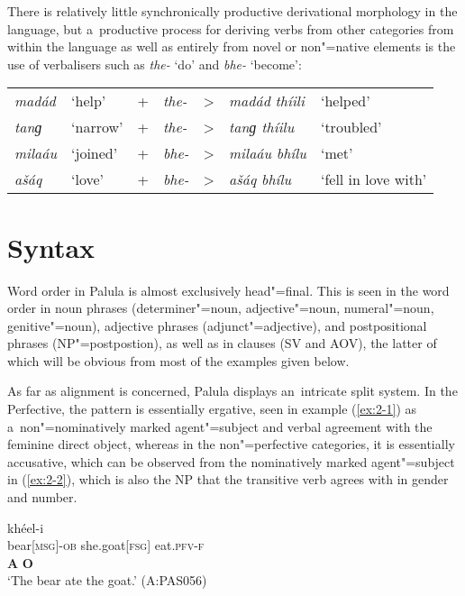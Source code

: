 There is relatively little synchronically productive derivational morphology in the language, but a~productive process for deriving verbs from other categories from within the language as well as entirely from novel or non"=native elements is the use of verbalisers such as \textit{the-} `do' and \textit{bhe-} `become':


\begin{table}[H]
\begin{tabularx}{\textwidth}{ l l l l l l l}
\textit{madád} &
`help' &
+ &
\textit{the-} &
{\textgreater} &
\textit{madád thíili} &
`helped'\\
\textit{tanɡ} &
`narrow' &
+ &
\textit{the-} &
{\textgreater} &
\textit{tanɡ thíilu} &
`troubled'\\
\textit{milaáu} &
`joined' &
+ &
\textit{bhe-} &
{\textgreater} &
\textit{milaáu bhílu} &
`met'\\
\textit{ašáq} &
`love' &
+ &
\textit{bhe-} &
{\textgreater} &
\textit{ašáq bhílu} &
`fell in love with'\\
\end{tabularx}
\end{table}



\section{Syntax}
\label{sec:2-3}
Word order in Palula is almost exclusively head"=final. This is seen in the word order in noun phrases (determiner"=noun, adjective"=noun, numeral"=noun, genitive"=noun), adjective phrases (adjunct"=adjective), and postpositional phrases (NP"=postpostion), as well as in clauses (SV and AOV), the latter of which will be obvious from most of the examples given below.


As far as alignment is concerned, Palula displays an~intricate split system. In the Perfective, the pattern is essentially ergative, seen in example (\ref{ex:2-1}) as a~non"=nominatively marked agent"=subject and verbal agreement with the feminine direct object, whereas in the non"=perfective categories, it is essentially accusative, which can be observed from the nominatively marked agent"=subject in (\ref{ex:2-2}), which is also the NP that the transitive verb agrees with in gender and number.

\begin{exe}
\ex
\label{ex:2-1}
\glll [íṇc̣-a] [čhéeli] khéel-i \\
bear[\textsc{msg}]-\textsc{ob} she.goat[\textsc{fsg}] eat.\textsc{pfv-}\textsc{f}\\
\textbf{A} \textbf{O} \\
\glt `The bear ate the goat.' (A:PAS056)
\end{exe}


